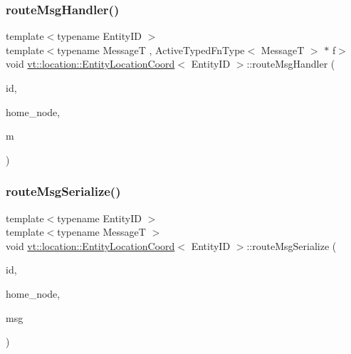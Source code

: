 \mbox{\label{structvt_1_1location_1_1_entity_location_coord_a0432bf605db83627c15e2c53920aff97}} 
\subsubsection{\texorpdfstring{route\+Msg\+Handler()}{routeMsgHandler()}}
{\footnotesize\ttfamily template$<$typename Entity\+ID $>$ \\
template$<$typename MessageT , Active\+Typed\+Fn\+Type$<$ Message\+T $>$ $\ast$ f$>$ \\
void \hyperlink{structvt_1_1location_1_1_entity_location_coord}{vt\+::location\+::\+Entity\+Location\+Coord}$<$ Entity\+ID $>$\+::route\+Msg\+Handler (\begin{DoxyParamCaption}\item[{Entity\+ID const \&}]{id,  }\item[{\hyperlink{namespacevt_a866da9d0efc19c0a1ce79e9e492f47e2}{Node\+Type} const \&}]{home\+\_\+node,  }\item[{MessageT $\ast$}]{m }\end{DoxyParamCaption})}

\mbox{\label{structvt_1_1location_1_1_entity_location_coord_a1a1d8dfa9ac9fdceadb5c2ef9b9cecb6}} 
\subsubsection{\texorpdfstring{route\+Msg\+Serialize()}{routeMsgSerialize()}}
{\footnotesize\ttfamily template$<$typename Entity\+ID $>$ \\
template$<$typename MessageT $>$ \\
void \hyperlink{structvt_1_1location_1_1_entity_location_coord}{vt\+::location\+::\+Entity\+Location\+Coord}$<$ Entity\+ID $>$\+::route\+Msg\+Serialize (\begin{DoxyParamCaption}\item[{Entity\+ID const \&}]{id,  }\item[{\hyperlink{namespacevt_a866da9d0efc19c0a1ce79e9e492f47e2}{Node\+Type} const \&}]{home\+\_\+node,  }\item[{\hyperlink{namespacevt_ab2b3d506ec8e8d1540aede826d84a239}{Msg\+Shared\+Ptr}$<$ MessageT $>$}]{msg }\end{DoxyParamCaption})}

